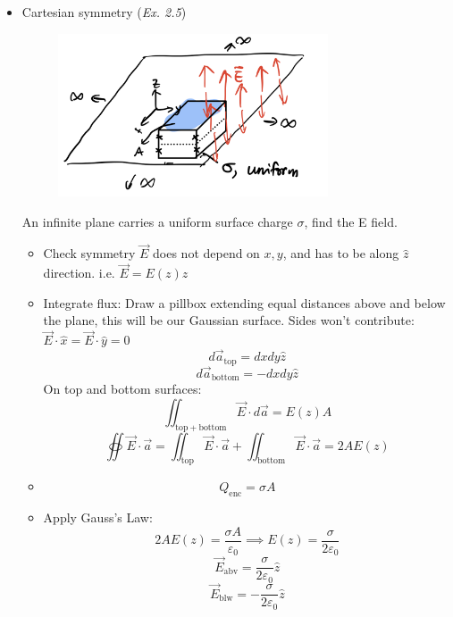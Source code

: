 \documentclass[12pt,a4paper,twoside]{article}
\begin{document}
\begin{itemize}
        \item Cartesian symmetry (\textit{Ex. 2.5})
            \begin{figure}[ht]
                \centering
                \includegraphics[width = 8cm]{250-Revision/gauss-cartesian.png}
            \end{figure}
            An infinite plane carries a uniform surface charge $\sigma$, find the E field.
            \begin{itemize}
                \item Check symmetry
                    \subitem $\overrightarrow{E}$ does not depend on $x, y$, and has to be along $\hat{z}$ direction. i.e. $\overrightarrow{E}=E(z)\hat{z}$
                \item Integrate flux:
                    \subitem Draw a pillbox extending equal distances above and below the plane, this will be our Gaussian surface.
                    \subitem Sides won't contribute: $\overrightarrow{E}\cdot \hat{x}=\overrightarrow{E}\cdot\hat{y}=0$
                    \[d\overrightarrow{a}_{\mathrm{top}}=dxdy\hat{z}\]
                    \[d\overrightarrow{a}_{\mathrm{bottom}}=-dxdy\hat{z}\]
                    \subitem On top and bottom surfaces:
                    \[\iint_{\mathrm{top+bottom}}\overrightarrow{E}\cdot d\overrightarrow{a}=E(z)A\] 
                    \[\oiint \overrightarrow{E}\cdot \overrightarrow{a}=\iint_{\mathrm{top}}\overrightarrow{E}\cdot \overrightarrow{a}+\iint_{\mathrm{bottom}}\overrightarrow{E}\cdot \overrightarrow{a}=2AE(z)\]
                \item
                \[Q_{\mathrm{enc}}=\sigma A\]
                \item Apply Gauss's Law:
                \[2AE(z)=\frac{\sigma A}{\varepsilon_0}\implies E(z)=\frac{\sigma }{2\varepsilon_0}\]
                \[\overrightarrow{E}_{\mathrm{abv}}=\frac{\sigma }{2\varepsilon_0}\hat{z}\]
                \[\overrightarrow{E}_{\mathrm{blw}}=-\frac{\sigma }{2\varepsilon_0}\hat{z}\]
            \end{itemize}
    \end{itemize}
\end{document}
